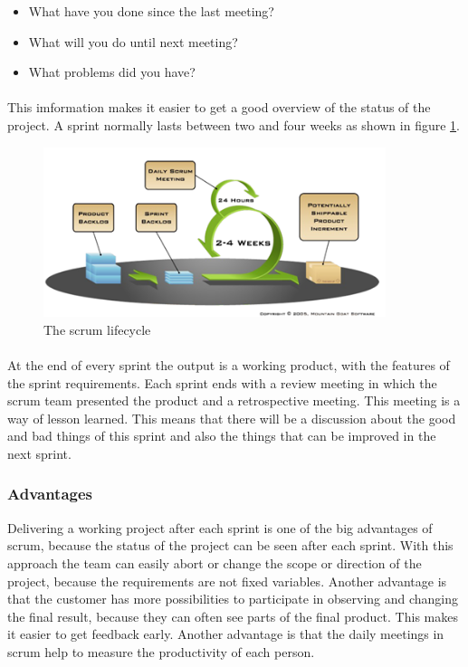 \begin{itemize}
  \item What have you done since the last meeting?
  \item What will you do until next meeting?
  \item What problems did you have?
\end{itemize}

\paragraph{} This imformation makes it easier to get a good overview of the status of the project. A sprint normally lasts between two and four weeks as shown in figure \ref{fig:PrelimMethodScrumLife}.

\begin{figure}[ht!]
  \centering
  \includegraphics[width=100mm]{./PreliminaryStudies/img/scrum2.png}
  \caption{The scrum lifecycle}
  \label{fig:PrelimMethodScrumLife}
\end{figure}

\paragraph{} At the end of every sprint the output is a working product, with the features of the sprint requirements. Each sprint ends with a review meeting in which the scrum team presented the product and a retrospective meeting. This meeting is a way of lesson learned. This means that there will be a discussion about the good and bad things of this sprint and also the things that can be improved in the next sprint. 

\subsubsection{Advantages}
Delivering a working project after each sprint is one of the big advantages of scrum, because the status of the project can be seen after each sprint. With this approach the team can easily abort or change the scope or direction of the project, because the requirements are not fixed variables. Another advantage is that the customer has more possibilities to participate in observing and changing the final result, because they can often see parts of the final product. This makes it easier to get feedback early. Another advantage is that the daily meetings in scrum help to measure the productivity of each person.

